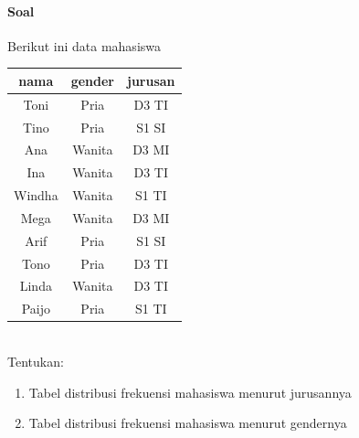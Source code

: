 \documentclass[a4paper,12pt]{article}
\begin{document}
\paragraph{Soal\\}
Berikut ini data mahasiswa\\
\begin{table}[!ht]
	\begin{tabular}{|c|c|c|}
		\hline 
		nama & {gender} & {jurusan} \\ 
		\hline 
		Toni & Pria & D3 TI \\ 
		\hline 
		Tino & Pria & S1 SI \\ 
		\hline 
		Ana & Wanita & D3 MI \\ 
		\hline 
		Ina & Wanita & D3 TI \\ 
		\hline 
		Windha & Wanita & S1 TI \\ 
		\hline 
		Mega & Wanita & D3 MI \\ 
		\hline 
		Arif & Pria & S1 SI \\ 
		\hline 
		Tono &  Pria & D3 TI \\ 
		\hline 
		Linda & Wanita & D3 TI \\ 
		\hline 
		Paijo & Pria & S1 TI \\ 
		\hline 
	\end{tabular}
\end{table}\\
Tentukan:
\begin{enumerate}
	\item Tabel distribusi frekuensi mahasiswa menurut jurusannya
	\item Tabel distribusi frekuensi mahasiswa menurut gendernya
\end{enumerate}
\end{document}
